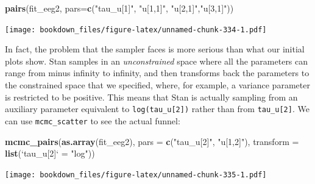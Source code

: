 \documentclass[12pt,]{krantz}
\newenvironment{Shaded}{\begin{snugshade}}{\end{snugshade}}
\newcommand{\DataTypeTok}[1]{\textcolor[rgb]{0.13,0.29,0.53}{#1}}
\newcommand{\KeywordTok}[1]{\textcolor[rgb]{0.13,0.29,0.53}{\textbf{#1}}}
\newcommand{\NormalTok}[1]{#1}
\newcommand{\StringTok}[1]{\textcolor[rgb]{0.31,0.60,0.02}{#1}}
\theoremstyle{definition}
\theoremstyle{definition}
\theoremstyle{definition}
\theoremstyle{remark}
\begin{document}
\begin{Shaded}
\begin{Highlighting}[]
\KeywordTok{pairs}\NormalTok{(fit_eeg2, }\DataTypeTok{pars=}\KeywordTok{c}\NormalTok{(}\StringTok{"tau_u[1]"}\NormalTok{, }\StringTok{"u[1,1]"}\NormalTok{, }\StringTok{"u[2,1]"}\NormalTok{,}\StringTok{"u[3,1]"}\NormalTok{))}
\end{Highlighting}
\end{Shaded}

\texttt{[image: bookdown\_files/figure-latex/unnamed-chunk-334-1.pdf]}

In fact, the problem that the sampler faces is more serious than what our initial plots show. Stan samples in an \emph{unconstrained} space where all the parameters can range from minus infinity to infinity, and then transforms back the parameters to the constrained space that we specified, where, for example, a variance parameter is restricted to be positive. This means that Stan is actually sampling from an auxiliary parameter equivalent to \texttt{log(tau\_u{[}2{]})} rather than from \texttt{tau\_u{[}2{]}}. We can use \texttt{mcmc\_scatter} to see the actual funnel:

\begin{Shaded}
\begin{Highlighting}[]
\KeywordTok{mcmc_pairs}\NormalTok{(}\KeywordTok{as.array}\NormalTok{(fit_eeg2), }\DataTypeTok{pars =} \KeywordTok{c}\NormalTok{(}\StringTok{"tau_u[2]"}\NormalTok{, }\StringTok{"u[1,2]"}\NormalTok{),}
           \DataTypeTok{transform =} \KeywordTok{list}\NormalTok{(}\StringTok{`}\DataTypeTok{tau_u[2]}\StringTok{`}\NormalTok{ =}\StringTok{ "log"}\NormalTok{))}
\end{Highlighting}
\end{Shaded}

\texttt{[image: bookdown\_files/figure-latex/unnamed-chunk-335-1.pdf]}
\end{document}
